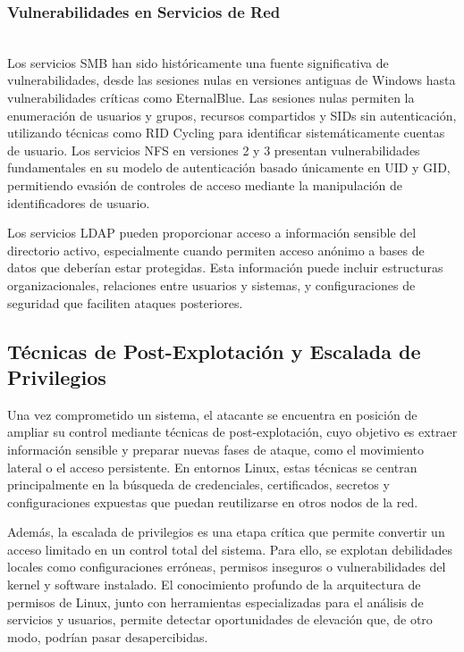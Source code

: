 \documentclass[runningheads]{llncs}
\begin{document}
\subsubsection{Vulnerabilidades en Servicios de Red}
\hfill\\

Los servicios SMB han sido históricamente una fuente significativa de vulnerabilidades, desde las sesiones nulas en versiones antiguas de Windows hasta vulnerabilidades críticas como EternalBlue. Las sesiones nulas permiten la enumeración de usuarios y grupos, recursos compartidos y SIDs sin autenticación, utilizando técnicas como RID Cycling para identificar sistemáticamente cuentas de usuario. Los servicios NFS en versiones 2 y 3 presentan vulnerabilidades fundamentales en su modelo de autenticación basado únicamente en UID y GID, permitiendo evasión de controles de acceso mediante la manipulación de identificadores de usuario.

Los servicios LDAP pueden proporcionar acceso a información sensible del directorio activo, especialmente cuando permiten acceso anónimo a bases de datos que deberían estar protegidas. Esta información puede incluir estructuras organizacionales, relaciones entre usuarios y sistemas, y configuraciones de seguridad que faciliten ataques posteriores.
\subsection{Técnicas de Post-Explotación y Escalada de Privilegios}

Una vez comprometido un sistema, el atacante se encuentra en posición de ampliar su control mediante técnicas de post-explotación, cuyo objetivo es extraer información sensible y preparar nuevas fases de ataque, como el movimiento lateral o el acceso persistente. En entornos Linux, estas técnicas se centran principalmente en la búsqueda de credenciales, certificados, secretos y configuraciones expuestas que puedan reutilizarse en otros nodos de la red.

Además, la escalada de privilegios es una etapa crítica que permite convertir un acceso limitado en un control total del sistema. Para ello, se explotan debilidades locales como configuraciones erróneas, permisos inseguros o vulnerabilidades del kernel y software instalado. El conocimiento profundo de la arquitectura de permisos de Linux, junto con herramientas especializadas para el análisis de servicios y usuarios, permite detectar oportunidades de elevación que, de otro modo, podrían pasar desapercibidas.
\end{document}

